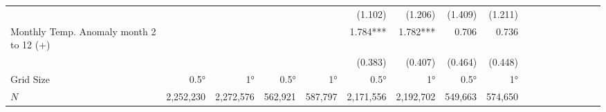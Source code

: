\begin{table}[H]
\begin{adjustbox}{max width=\linewidth}
\begin{tabular}{lrrrrrrrrrrrrrrrr}
                                             &             &             &             &             &      (1.102) &      (1.206) &      (1.409) &      (1.211)  \\
Monthly Temp. Anomaly month 2 to 12 (+)      &             &             &             &             &     1.784*** &     1.782*** &        0.706 &        0.736  \\
                                             &             &             &             &             &      (0.383) &      (0.407) &      (0.464) &      (0.448)  \\

\midrule
Grid Size                                   &       0.5° &      1°    &         0.5° &      1°   &      0.5° &     1°    &          0.5° &      1°   \\ 
$N$                                         &   2,252,230 &   2,272,576 &      562,921 &     587,797 &   2,171,556 &    2,192,702 &    549,663   &      574,650  \\ 
\bottomrule
\end{tabular}
\end{adjustbox}
\end{table}